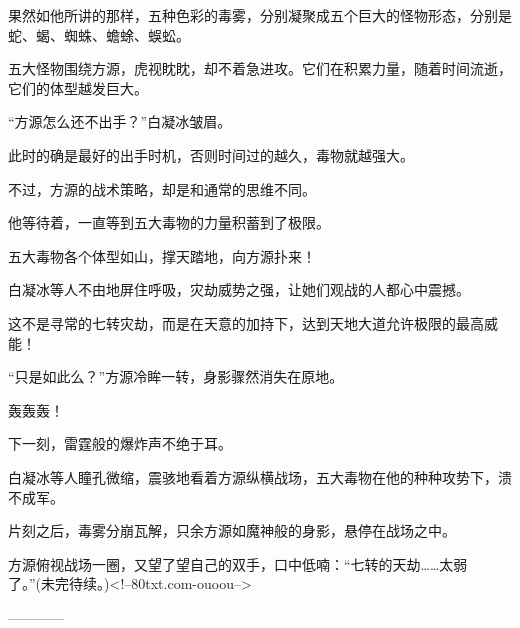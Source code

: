 \begin{this_body}
果然如他所讲的那样，五种色彩的毒雾，分别凝聚成五个巨大的怪物形态，分别是蛇、蝎、蜘蛛、蟾蜍、蜈蚣。

五大怪物围绕方源，虎视眈眈，却不着急进攻。它们在积累力量，随着时间流逝，它们的体型越发巨大。

“方源怎么还不出手？”白凝冰皱眉。

此时的确是最好的出手时机，否则时间过的越久，毒物就越强大。

不过，方源的战术策略，却是和通常的思维不同。

他等待着，一直等到五大毒物的力量积蓄到了极限。

五大毒物各个体型如山，撑天踏地，向方源扑来！

白凝冰等人不由地屏住呼吸，灾劫威势之强，让她们观战的人都心中震撼。

这不是寻常的七转灾劫，而是在天意的加持下，达到天地大道允许极限的最高威能！

“只是如此么？”方源冷眸一转，身影骤然消失在原地。

轰轰轰！

下一刻，雷霆般的爆炸声不绝于耳。

白凝冰等人瞳孔微缩，震骇地看着方源纵横战场，五大毒物在他的种种攻势下，溃不成军。

片刻之后，毒雾分崩瓦解，只余方源如魔神般的身影，悬停在战场之中。

方源俯视战场一圈，又望了望自己的双手，口中低喃：“七转的天劫……太弱了。”(未完待续。)<!--80txt.com-ouoou-->

------------

\end{this_body}

